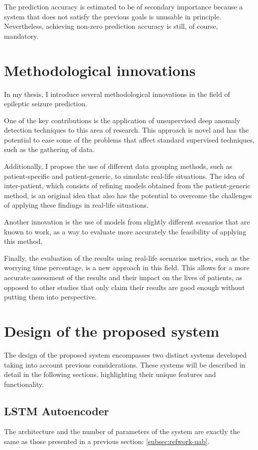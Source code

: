 The prediction accuracy is estimated to be of secondary importance because a system that does not satisfy the previous goals is unusable in principle. Nevertheless, achieving non-zero prediction accuracy is still, of course, mandatory.

\section{Methodological innovations}
In my thesis, I introduce several methodological innovations in the field of epileptic seizure prediction. 

One of the key contributions is the application of unsupervised deep anomaly detection techniques to this area of research. This approach is novel and has the potential to ease some of the problems that affect standard supervised techniques, such as the gathering of data. 

Additionally, I propose the use of different data grouping methods, such as patient-specific and patient-generic, to simulate real-life situations. The idea of inter-patient, which consists of refining models obtained from the patient-generic method, is an original idea that also has the potential to overcome the challenges of applying these findings in real-life situations. 

Another innovation is the use of models from slightly different scenarios that are known to work, as a way to evaluate more accurately the feasibility of applying this method. 

Finally, the evaluation of the results using real-life scenarios metrics, such as the worrying time percentage, is a new approach in this field. This allows for a more accurate assessment of the results and their impact on the lives of patients, as opposed to other studies that only claim their results are good enough without putting them into perspective.

\section{Design of the proposed system}
The design of the proposed system encompasses two distinct systems developed taking into account previous considerations. These systems will be described in detail in the following sections, highlighting their unique features and functionality.

\subsection{LSTM Autoencoder} \label{subsec:lstm}
The architecture and the number of parameters of the system are exactly the same as those presented in a previous section: \ref{subsec:refwork-uab}.

